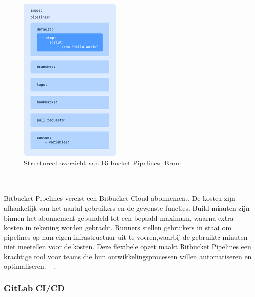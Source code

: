 \begin{figure}{\textwidth}
    \centering
    \includegraphics[width=0.3\linewidth]{Foto's/yml-structure.png}
    \caption{Structureel overzicht van Bitbucket Pipelines. Bron:~\autocite{atlassianConfigure}.}
    \label{fig:Structureel-overzicht}
\end{figure}
\\\\
Bitbucket Pipelines vereist een Bitbucket Cloud-abonnement. De kosten zijn afhankelijk van het aantal gebruikers en de gewenste functies. Build-minuten zijn binnen het abonnement gebundeld tot een bepaald maximum, waarna extra kosten in rekening worden gebracht. Runners stellen gebruikers in staat om pipelines op hun eigen infrastructuur uit te voeren,waarbij de gebruikte minuten niet meetellen voor de kosten. Deze flexibele opzet maakt Bitbucket Pipelines een krachtige tool voor teams die hun ontwikkelingsprocessen willen automatiseren en optimaliseren.~\autocite{atlassianBambooSpecs}~\autocite{atlassianPricing}.

\newpage
\subsubsection{GitLab CI/CD}

